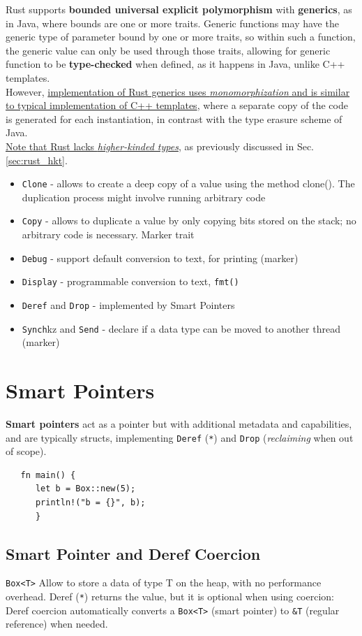 Rust supports \textbf{bounded universal explicit polymorphism}
with \textbf{generics}, as in Java, where bounds are one or
more traits. 
Generic functions may have the generic type of parameter
bound by one or more traits, so within such a function, the
generic value can only be used through those traits,
allowing for generic function to be \textbf{type-checked} when
defined, as it happens in Java, unlike C++ templates.\\
However, \ul{implementation of Rust generics uses \textit{monomorphization} and is similar to
typical implementation of C++ templates}, where a separate copy
of the code is generated for each instantiation, in contrast with the
type erasure scheme of Java.\\
\ul{Note that Rust lacks \textit{higher-kinded types}}, as previously discussed in Sec. \ref{sec:rust_hkt}.
\begin{itemize}
	\item \texttt{Clone} - allows to create a deep copy of a value using the method
clone(). The duplication process might involve running arbitrary
code
	\item \texttt{Copy} - allows to duplicate a value by only copying bits stored on the
stack; no arbitrary code is necessary. Marker trait
	\item \texttt{Debug} - support default conversion to text, for printing (marker)
	\item \texttt{Display} - programmable conversion to text, \lstinline|fmt()|
	\item \texttt{Deref} and \texttt{Drop} - implemented by Smart Pointers
	\item \texttt{Synch}kz and \texttt{Send} - declare if a data type can be moved to another
thread (marker)
\end{itemize}

\section{Smart Pointers}
\textbf{Smart pointers} act as a pointer but with additional metadata and capabilities, and are typically structs, implementing \texttt{Deref} (\lstinline|*|) and
\texttt{Drop} (\textit{reclaiming} when out of scope).

\begin{lstlisting}
   fn main() {
      let b = Box::new(5);
      println!("b = {}", b);
      }
\end{lstlisting}

\subsection{Smart Pointer and Deref Coercion}
\lstinline|Box<T>| Allow to store a data of type T on the heap, with no performance overhead.
Deref (\lstinline|*|) returns the value, but it is optional when using coercion:
Deref coercion automatically converts a \lstinline|Box<T>| (smart pointer) to \lstinline|&T| (regular reference) when needed.

